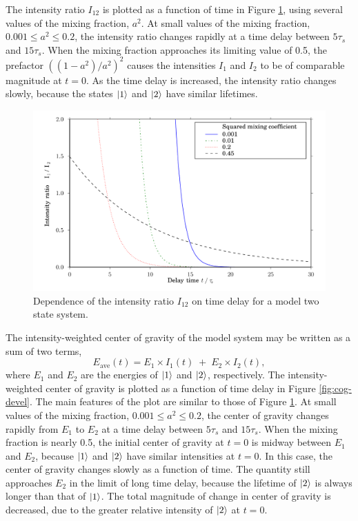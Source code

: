 \documentclass[12pt]{mitthesis}
\begin{document}
The intensity ratio $I_{12}$ is plotted as a function of time in
Figure \ref{fig:ratio-devel}, using several values of the mixing
fraction, $a^2$.  At small values of the mixing fraction, $0.001
\leq a^2 \leq 0.2$, the intensity ratio changes rapidly at a time
delay between $5\tau_s$ and $15\tau_s$.  When the mixing fraction
approaches its limiting value of 0.5, the prefactor $( (1 -
a^2)/a^2 )^2$ causes the intensities $I_1$ and $I_2$ to be
of comparable magnitude at $t=0$.  As the time delay is increased, the
intensity ratio changes slowly, because the states $\mathinner{|{1}\rangle}$ and
$\mathinner{|{2}\rangle}$ have similar lifetimes.

\begin{figure}
  \caption{Dependence of the intensity ratio $I_{12}$ on time delay
    for a model two state system.}
  \label{fig:ratio-devel}

  \centering
  \includegraphics[width=6in]{ratio-development.pdf}
\end{figure}

The intensity-weighted center of gravity of the model system may be
written as a sum of two terms,
\begin{equation}
  E_{\text{ave}}(t) = E_1 \times I_1(t) \; + \; E_2 \times I_2(t),
\end{equation}
where $E_1$ and $E_2$ are the energies of $\mathinner{|{1}\rangle}$ and $\mathinner{|{2}\rangle}$,
respectively.  The intensity-weighted center of gravity is plotted as
a function of time delay in Figure \ref{fig:cog-devel}.  The main
features of the plot are similar to those of Figure
\ref{fig:ratio-devel}.  At small values of the mixing fraction, $0.001
\leq a^2 \leq 0.2$, the center of gravity changes rapidly from $E_1$
to $E_2$ at a time delay between $5\tau_s$ and $15\tau_s$.  When the
mixing fraction is nearly 0.5, the initial center of gravity at $t=0$
is midway between $E_1$ and $E_2$, because $\mathinner{|{1}\rangle}$ and $\mathinner{|{2}\rangle}$
have similar intensities at $t=0$.  In this case, the center of
gravity changes slowly as a function of time.  The quantity still
approaches $E_2$ in the limit of long time delay, because the lifetime
of $\mathinner{|{2}\rangle}$ is always longer than that of $\mathinner{|{1}\rangle}$.  The total
magnitude of change in center of gravity is decreased, due to the
greater relative intensity of $\mathinner{|{2}\rangle}$ at $t=0$.
\end{document}
